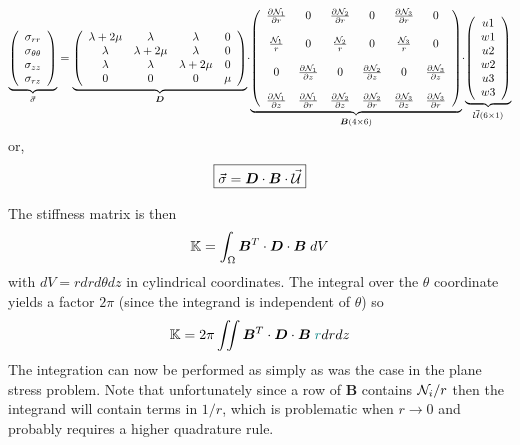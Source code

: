 \[
\underbrace{
\left(
\begin{array}{c}
\sigma_{rr} \\
\sigma_{\theta\theta} \\
\sigma_{zz} \\
\sigma_{rz} 
\end{array}
\right)
}_{\vec{\sigma}}
=
\underbrace{
\left(
\begin{array}{cccc}
\lambda+2\mu & \lambda & \lambda & 0  \\
\lambda & \lambda+2\mu & \lambda & 0  \\
\lambda & \lambda & \lambda+2\mu & 0  \\
0 & 0 & 0 & \mu 
\end{array}
\right)
}_{\bm D}
\!
\cdot
\!
\underbrace{
\left(
\begin{array}{ccccccccc}
\frac{\partial {\mathcal{N}}_1}{\partial r} &  0 &  
\frac{\partial {\mathcal{N}}_2}{\partial r} &  0 &
\frac{\partial {\mathcal{N}}_3}{\partial r} &  0 \\  \\
\frac{{\mathcal{N}}_1}{r}  & 0 &  
\frac{{\mathcal{N}}_2}{r}  & 0 &
\frac{{\mathcal{N}}_3}{r}  & 0 \\  \\
 0 & \frac{\partial {\mathcal{N}}_1}{\partial z}  &
 0 & \frac{\partial {\mathcal{N}}_2}{\partial z}  &
 0 & \frac{\partial {\mathcal{N}}_3}{\partial z}  \\ \\
\frac{\partial {\mathcal{N}}_1}{\partial z} & \frac{\partial {\mathcal{N}}_1}{\partial r}  &
\frac{\partial {\mathcal{N}}_2}{\partial z} & \frac{\partial {\mathcal{N}}_2}{\partial r}  &
\frac{\partial {\mathcal{N}}_3}{\partial z} & \frac{\partial {\mathcal{N}}_3}{\partial r}   
\end{array}
\right)
}_{\bm B (4\times 6) }
\!
\cdot
\!
\underbrace{
\left(
\begin{array}{c}
u1 \\  w1 \\ u2 \\  w2 \\ u3 \\ w3 
\end{array}
\right)
}_{\vec {\cal U} (6\times1)}
\]
or, 
\[
\boxed{
\vec\sigma = {\bm D} \cdot {\bm B} \cdot \vec{\cal U}
}
\]

The stiffness matrix is then 
\[
{\mathbb{K}} = \int_\Omega {\bm B}^T \cdot {\bm D} \cdot {\bm B}\; dV
\]
with $dV= r dr d\theta dz$ in cylindrical coordinates. The integral 
over the $\theta$ coordinate yields a factor $2\pi$ (since the 
integrand is independent of $\theta$) so 
\[
{\mathbb{K}} = 2 \pi \iint {\bm B}^T \cdot {\bm D} \cdot {\bm B}\; {\color{teal} r} drdz
\]
The integration can now be performed as simply as was the case in the plane stress problem.
Note that unfortunately since a row of ${\bm B}$ contains ${\mathcal{N}}_i/r$ 
then the integrand will contain terms in $1/r$, which is problematic when $r\rightarrow 0$
and probably requires a higher quadrature rule.





